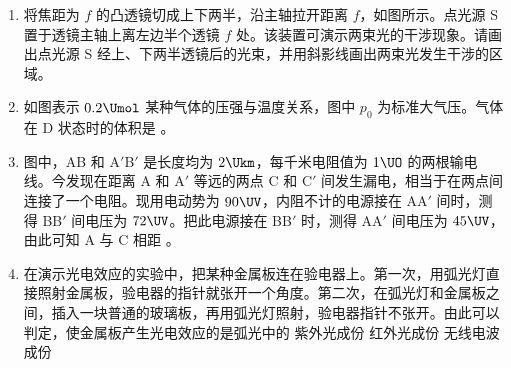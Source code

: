 \documentclass[\gkver]{gaokaozhenti}
\begin{document}
\begin{enumerate}
\item
将焦距为 $f$ 的凸透镜切成上下两半，沿主轴拉开距离 $f$，如图所示。点光源 S 置于透镜主轴上离左边半个透镜 $f$ 处。该装置可演示两束光的干涉现象。请画出点光源 S 经上、下两半透镜后的光束，并用斜影线画出两束光发生干涉的区域。
\drawpicanswer{\onepicture[align=right, w=9.28cm]{}}{\onepicture[align=right, w=9.30cm]{}}

\item
如图表示 $0.2\Umol$ 某种气体的压强与温度关系，图中 $p_{0}$ 为标准大气压。气体在 D 状态时的体积是 \tkanswer{$5.6\UL$}。
\onepicture[align=right, w=4.67cm]{}
\jdanswer{
$5.6\UL$
}

\item
图中，AB 和 A$'$B$'$ 是长度均为 $2\Ukm$，每千米电阻值为 $1\UO$ 的两根输电线。今发现在距离 A 和 A$'$ 等远的两点 C 和 C$'$ 间发生漏电，相当于在两点间连接了一个电阻。现用电动势为 $90\UV$，内阻不计的电源接在 AA$'$ 间时，测得 BB$'$ 间电压为 $72\UV$。把此电源接在 BB$'$ 时，测得 AA$'$ 间电压为 $45\UV$，由此可知 A 与 C 相距 \tkanswer{$0.4\Ukm$}。
\onepicture[align=right, w=4.33cm]{}
\jdanswer{
$0.4\Ukm$
}

\item
在演示光电效应的实验中，把某种金属板连在验电器上。第一次，用弧光灯直接照射金属板，验电器的指针就张开一个角度。第二次，在弧光灯和金属板之间，插入一块普通的玻璃板，再用弧光灯照射，验电器指针不张开。由此可以判定，使金属板产生光电效应的是弧光中的
{紫外光成份}
{红外光成份}
{无线电波成份}


\end{enumerate}
\end{document}
